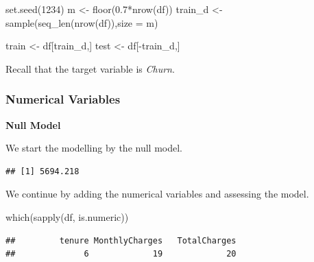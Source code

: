 \documentclass[
  twoside]{article}
\newenvironment{Shaded}{\begin{snugshade}}{\end{snugshade}}
\newcommand{\AttributeTok}[1]{\textcolor[rgb]{0.77,0.63,0.00}{#1}}
\newcommand{\DecValTok}[1]{\textcolor[rgb]{0.00,0.00,0.81}{#1}}
\newcommand{\FloatTok}[1]{\textcolor[rgb]{0.00,0.00,0.81}{#1}}
\newcommand{\FunctionTok}[1]{\textcolor[rgb]{0.00,0.00,0.00}{#1}}
\newcommand{\NormalTok}[1]{#1}
\newcommand{\OtherTok}[1]{\textcolor[rgb]{0.56,0.35,0.01}{#1}}
\newcommand{\SpecialCharTok}[1]{\textcolor[rgb]{0.00,0.00,0.00}{#1}}
\begin{document}
\begin{Shaded}
\begin{Highlighting}[]
\FunctionTok{set.seed}\NormalTok{(}\DecValTok{1234}\NormalTok{)}
\NormalTok{m }\OtherTok{\textless{}{-}} \FunctionTok{floor}\NormalTok{(}\FloatTok{0.7}\SpecialCharTok{*}\FunctionTok{nrow}\NormalTok{(df))}
\NormalTok{train\_d }\OtherTok{\textless{}{-}} \FunctionTok{sample}\NormalTok{(}\FunctionTok{seq\_len}\NormalTok{(}\FunctionTok{nrow}\NormalTok{(df)),}\AttributeTok{size =}\NormalTok{ m)}

\NormalTok{train }\OtherTok{\textless{}{-}}\NormalTok{ df[train\_d,]}
\NormalTok{test }\OtherTok{\textless{}{-}}\NormalTok{ df[}\SpecialCharTok{{-}}\NormalTok{train\_d,]}
\end{Highlighting}
\end{Shaded}

Recall that the target variable is \emph{Churn}.

\hypertarget{numerical-variables}{%
\subsubsection{Numerical Variables}\label{numerical-variables}}

\textbf{Null Model}

We start the modelling by the null model.

\begin{Shaded}
\end{Shaded}

\begin{verbatim}
## [1] 5694.218
\end{verbatim}

We continue by adding the numerical variables and assessing the model.

\begin{Shaded}
\begin{Highlighting}[]
\FunctionTok{which}\NormalTok{(}\FunctionTok{sapply}\NormalTok{(df, is.numeric))}
\end{Highlighting}
\end{Shaded}

\begin{verbatim}
##         tenure MonthlyCharges   TotalCharges 
##              6             19             20
\end{verbatim}
\end{document}

